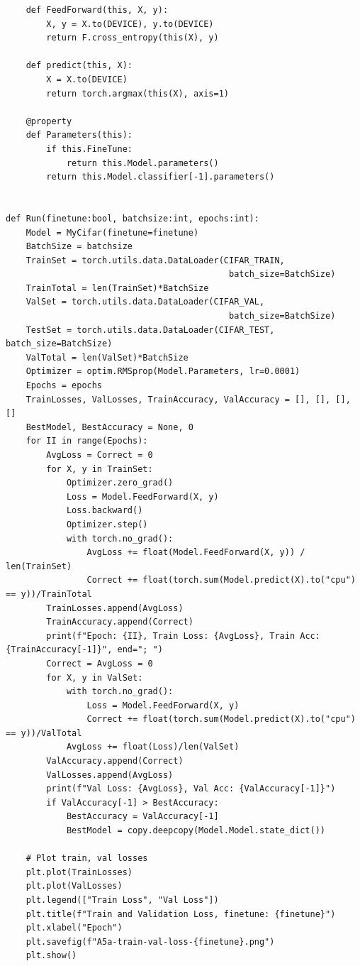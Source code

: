 \documentclass[]{article}
\begin{document}
\begin{lstlisting}
    def FeedForward(this, X, y):
        X, y = X.to(DEVICE), y.to(DEVICE)
        return F.cross_entropy(this(X), y)

    def predict(this, X):
        X = X.to(DEVICE)
        return torch.argmax(this(X), axis=1)

    @property
    def Parameters(this):
        if this.FineTune:
            return this.Model.parameters()
        return this.Model.classifier[-1].parameters()


def Run(finetune:bool, batchsize:int, epochs:int):
    Model = MyCifar(finetune=finetune)
    BatchSize = batchsize
    TrainSet = torch.utils.data.DataLoader(CIFAR_TRAIN,
                                            batch_size=BatchSize)
    TrainTotal = len(TrainSet)*BatchSize
    ValSet = torch.utils.data.DataLoader(CIFAR_VAL,
                                            batch_size=BatchSize)
    TestSet = torch.utils.data.DataLoader(CIFAR_TEST, batch_size=BatchSize)
    ValTotal = len(ValSet)*BatchSize
    Optimizer = optim.RMSprop(Model.Parameters, lr=0.0001)
    Epochs = epochs
    TrainLosses, ValLosses, TrainAccuracy, ValAccuracy = [], [], [], []
    BestModel, BestAccuracy = None, 0
    for II in range(Epochs):
        AvgLoss = Correct = 0
        for X, y in TrainSet:
            Optimizer.zero_grad()
            Loss = Model.FeedForward(X, y)
            Loss.backward()
            Optimizer.step()
            with torch.no_grad():
                AvgLoss += float(Model.FeedForward(X, y)) / len(TrainSet)
                Correct += float(torch.sum(Model.predict(X).to("cpu") == y))/TrainTotal
        TrainLosses.append(AvgLoss)
        TrainAccuracy.append(Correct)
        print(f"Epoch: {II}, Train Loss: {AvgLoss}, Train Acc: {TrainAccuracy[-1]}", end="; ")
        Correct = AvgLoss = 0
        for X, y in ValSet:
            with torch.no_grad():
                Loss = Model.FeedForward(X, y)
                Correct += float(torch.sum(Model.predict(X).to("cpu") == y))/ValTotal
            AvgLoss += float(Loss)/len(ValSet)
        ValAccuracy.append(Correct)
        ValLosses.append(AvgLoss)
        print(f"Val Loss: {AvgLoss}, Val Acc: {ValAccuracy[-1]}")
        if ValAccuracy[-1] > BestAccuracy:
            BestAccuracy = ValAccuracy[-1]
            BestModel = copy.deepcopy(Model.Model.state_dict())

    # Plot train, val losses
    plt.plot(TrainLosses)
    plt.plot(ValLosses)
    plt.legend(["Train Loss", "Val Loss"])
    plt.title(f"Train and Validation Loss, finetune: {finetune}")
    plt.xlabel("Epoch")
    plt.savefig(f"A5a-train-val-loss-{finetune}.png")
    plt.show()


\end{lstlisting}
\end{document}
